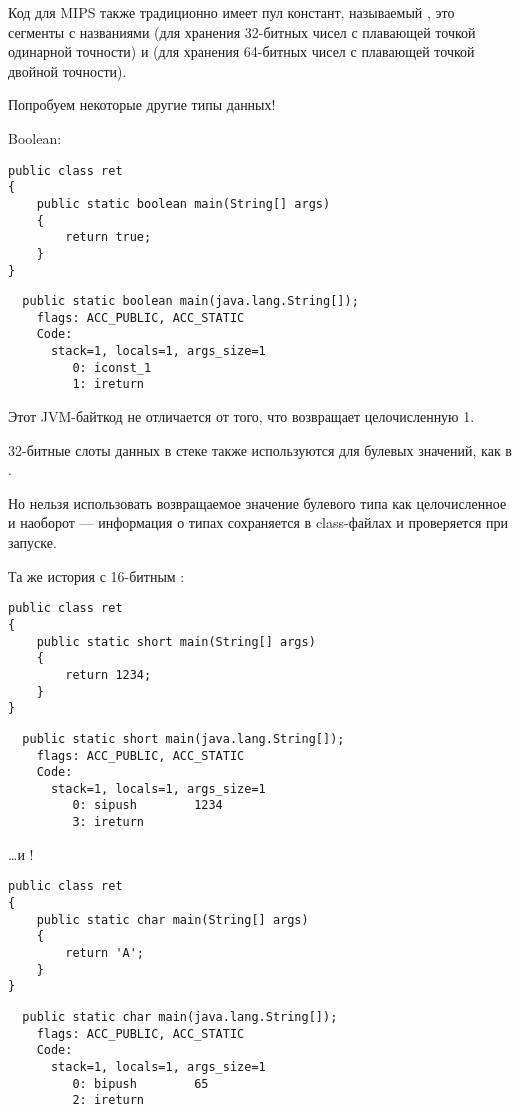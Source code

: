 Код для MIPS также традиционно имеет пул констант, называемый , это сегменты
с названиями  (для хранения 32-битных чисел с плавающей точкой одинарной точности) и
(для хранения 64-битных чисел с плавающей точкой двойной точности).

Попробуем некоторые другие типы данных!

Boolean:

\begin{lstlisting}[style=customjava]
public class ret
{
	public static boolean main(String[] args) 
	{
		return true;
	}
}
\end{lstlisting}

\begin{lstlisting}
  public static boolean main(java.lang.String[]);
    flags: ACC_PUBLIC, ACC_STATIC
    Code:
      stack=1, locals=1, args_size=1
         0: iconst_1      
         1: ireturn       
\end{lstlisting}

Этот JVM-байткод не отличается от того, что возвращает целочисленную 1.

32-битные слоты данных в стеке также используются для булевых значений, как в \CCpp.

Но нельзя использовать возвращаемое значение булевого типа как целочисленное и наоборот --- информация 
о типах сохраняется в class-файлах и проверяется при запуске.

Та же история с 16-битным :

\begin{lstlisting}[style=customjava]
public class ret
{
	public static short main(String[] args) 
	{
		return 1234;
	}
}
\end{lstlisting}

\begin{lstlisting}
  public static short main(java.lang.String[]);
    flags: ACC_PUBLIC, ACC_STATIC
    Code:
      stack=1, locals=1, args_size=1
         0: sipush        1234
         3: ireturn       
\end{lstlisting}

\dots и !

\begin{lstlisting}[style=customjava]
public class ret
{
	public static char main(String[] args) 
	{
		return 'A';
	}
}
\end{lstlisting}

\begin{lstlisting}
  public static char main(java.lang.String[]);
    flags: ACC_PUBLIC, ACC_STATIC
    Code:
      stack=1, locals=1, args_size=1
         0: bipush        65
         2: ireturn       
\end{lstlisting}

